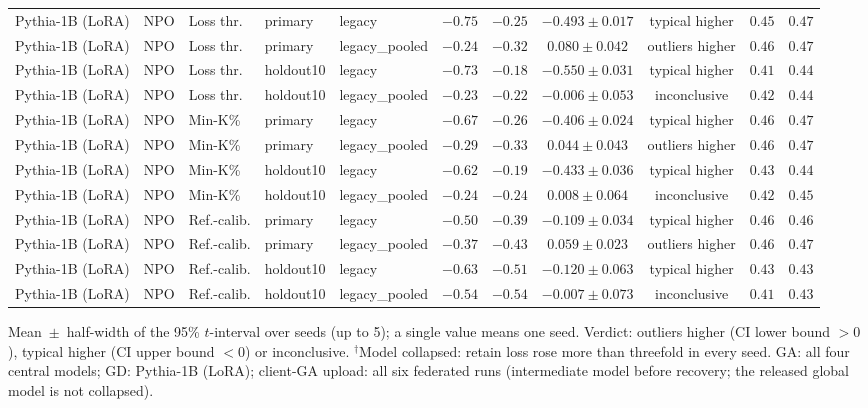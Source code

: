 {\begin{longtable}{@{\extracolsep{\fill}}lllllcccccc@{}}
Pythia-1B (LoRA) & NPO & Loss thr. & primary & legacy & $-0.75$ & $-0.25$ & $-0.493 \pm 0.017$ & typical higher & $0.45$ & $0.47$ \\
Pythia-1B (LoRA) & NPO & Loss thr. & primary & legacy\_pooled & $-0.24$ & $-0.32$ & $0.080 \pm 0.042$ & outliers higher & $0.46$ & $0.47$ \\
Pythia-1B (LoRA) & NPO & Loss thr. & holdout10 & legacy & $-0.73$ & $-0.18$ & $-0.550 \pm 0.031$ & typical higher & $0.41$ & $0.44$ \\
Pythia-1B (LoRA) & NPO & Loss thr. & holdout10 & legacy\_pooled & $-0.23$ & $-0.22$ & $-0.006 \pm 0.053$ & inconclusive & $0.42$ & $0.44$ \\
Pythia-1B (LoRA) & NPO & Min-K\% & primary & legacy & $-0.67$ & $-0.26$ & $-0.406 \pm 0.024$ & typical higher & $0.46$ & $0.47$ \\
Pythia-1B (LoRA) & NPO & Min-K\% & primary & legacy\_pooled & $-0.29$ & $-0.33$ & $0.044 \pm 0.043$ & outliers higher & $0.46$ & $0.47$ \\
Pythia-1B (LoRA) & NPO & Min-K\% & holdout10 & legacy & $-0.62$ & $-0.19$ & $-0.433 \pm 0.036$ & typical higher & $0.43$ & $0.44$ \\
Pythia-1B (LoRA) & NPO & Min-K\% & holdout10 & legacy\_pooled & $-0.24$ & $-0.24$ & $0.008 \pm 0.064$ & inconclusive & $0.42$ & $0.45$ \\
Pythia-1B (LoRA) & NPO & Ref.-calib. & primary & legacy & $-0.50$ & $-0.39$ & $-0.109 \pm 0.034$ & typical higher & $0.46$ & $0.46$ \\
Pythia-1B (LoRA) & NPO & Ref.-calib. & primary & legacy\_pooled & $-0.37$ & $-0.43$ & $0.059 \pm 0.023$ & outliers higher & $0.46$ & $0.47$ \\
Pythia-1B (LoRA) & NPO & Ref.-calib. & holdout10 & legacy & $-0.63$ & $-0.51$ & $-0.120 \pm 0.063$ & typical higher & $0.43$ & $0.43$ \\
Pythia-1B (LoRA) & NPO & Ref.-calib. & holdout10 & legacy\_pooled & $-0.54$ & $-0.54$ & $-0.007 \pm 0.073$ & inconclusive & $0.41$ & $0.43$ \\
\end{longtable}
Mean~$\pm$~half-width of the 95\% $t$-interval over seeds (up to 5); a single value means one seed. Verdict: outliers higher (CI lower bound $>0$), typical higher (CI upper bound $<0$) or inconclusive. $^{\dagger}$Model collapsed: retain loss rose more than threefold in every seed. GA: all four central models; GD: Pythia-1B (LoRA); client-GA upload: all six federated runs (intermediate model before recovery; the released global model is not collapsed).\par
}
